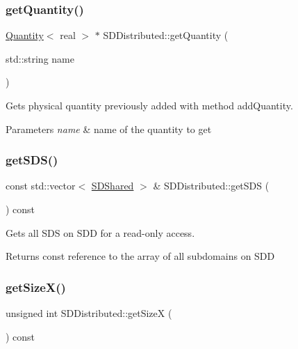 \subsubsection{\texorpdfstring{get\+Quantity()}{getQuantity()}}
{\footnotesize\ttfamily \mbox{\hyperlink{classQuantity}{Quantity}}$<$ real $>$ $\ast$ S\+D\+Distributed\+::get\+Quantity (\begin{DoxyParamCaption}\item[{std\+::string}]{name }\end{DoxyParamCaption})}



Gets physical quantity previously added with method add\+Quantity. 


\begin{DoxyParams}{Parameters}
{\em name} & name of the quantity to get \\
\hline
\end{DoxyParams}
\mbox{\label{classSDDistributed_a9afba0607b6012a0e446b95251559f5d}} 
\subsubsection{\texorpdfstring{get\+S\+D\+S()}{getSDS()}}
{\footnotesize\ttfamily const std\+::vector$<$ \mbox{\hyperlink{classSDShared}{S\+D\+Shared}} $>$ \& S\+D\+Distributed\+::get\+S\+DS (\begin{DoxyParamCaption}{ }\end{DoxyParamCaption}) const}



Gets all S\+DS on S\+DD for a read-\/only access. 

\begin{DoxyReturn}{Returns}
const reference to the array of all subdomains on S\+DD 
\end{DoxyReturn}
\mbox{\label{classSDDistributed_a567b9535558271515166ce7ebd3f6c29}} 
\subsubsection{\texorpdfstring{get\+Size\+X()}{getSizeX()}}
{\footnotesize\ttfamily unsigned int S\+D\+Distributed\+::get\+SizeX (\begin{DoxyParamCaption}{ }\end{DoxyParamCaption}) const}



